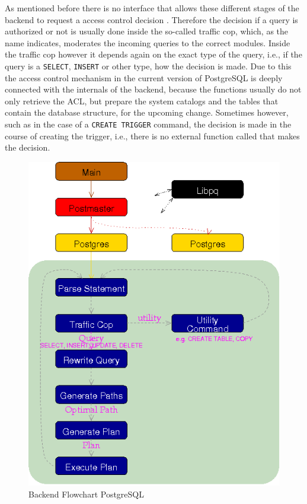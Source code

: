 %
As mentioned before there is no interface that allows these different stages of the backend to request a access control decision .
%
Therefore the decision if a query is authorized or not is usually done inside the so-called traffic cop, which, as the name indicates, moderates  the incoming queries to the correct modules.
%
Inside the traffic cop however it depends again on the exact type of the query, i.e., if the query is a \texttt{SELECT}, \texttt{INSERT} or other type, how the decision is made. 
%
Due to this\remark{,} the access control mechanism in the current version of PostgreSQL is deeply connected with the internals of the backend, because the functions usually do not only retrieve the ACL, but prepare the system catalogs and the tables that contain the database structure, for the upcoming change. 
%
Sometimes however, such as in the case of a \texttt{CREATE TRIGGER} command, the decision is made in the course of creating the trigger, i.e., there is no external function called that makes the decision.
%
\begin{figure}[!ht]
  \centering
    \includegraphics[width=1\textwidth]{img/backend_flowchart.png}
    \caption{Backend Flowchart PostgreSQL \protect \footnotemark}\label{figure:postgresql:architecture}
\end{figure}
%
%
\FloatBarrier
%
